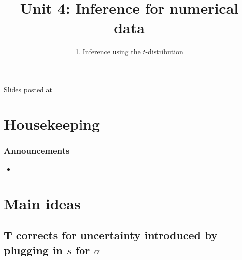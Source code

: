 \documentclass[11pt,containsverbatim,handout,xcolor=xelatex,dvipsnames,table]{beamer}
\title{Unit 4: Inference for numerical data}
\subtitle{1. Inference using the $t$-distribution}
\author{\CourseName}
\date{}
\institute{\InstituteName}
\begin{document}



\begin{frame}[plain]

\titlepage

\vfill

{\scriptsize {} \hfill Slides posted at  \webURL{\CourseSite}}

\addtocounter{framenumber}{-1} 

\end{frame}


\section{Housekeeping}


\begin{frame}
\frametitle{Announcements}

\begin{itemize}

\item 

\end{itemize}

\end{frame}


\section{Main ideas}


\subsection{T corrects for uncertainty introduced by plugging in $s$ for $\sigma$}
\label{mi1}

\end{document}
